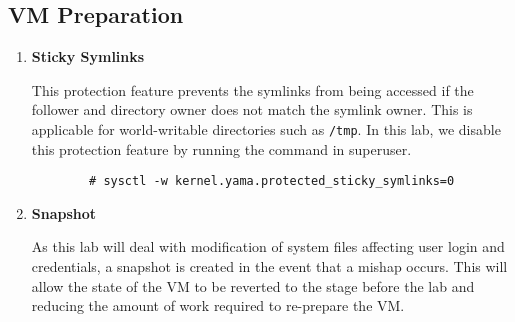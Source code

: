 \documentclass[a4paper,12pt]{article}
\begin{document}
\subsection{VM Preparation}\vspace{1em}
\begin{enumerate}
	\item \textbf{Sticky Symlinks}\begin{par}This protection feature prevents the symlinks from being accessed if the follower and directory owner does not match the symlink owner. This is applicable for world-writable directories such as \texttt{/tmp}. In this lab, we disable this protection feature by running the command in superuser.
		\begin{verbatim}
		# sysctl -w kernel.yama.protected_sticky_symlinks=0\end{verbatim}
	\end{par}
	\item \textbf{Snapshot}\begin{par}
		As this lab will deal with modification of system files affecting user login and credentials, a snapshot is created in the event that a mishap occurs. This will allow the state of the VM to be reverted to the stage before the lab and reducing the amount of work required to re-prepare the VM.\end{par}
\end{enumerate}
\newpage
\end{document}
